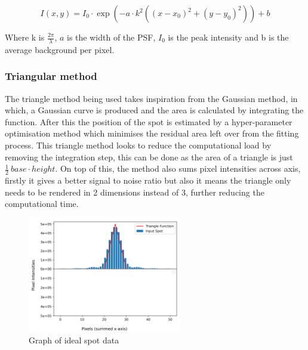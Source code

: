 \documentclass[aps,pra,a4paper,nofootinbib,onecolumn,tightenlines,longbibliography,12pt,amsfonts,amssymb,amsmath,floatfix]{revtex4-2} %
\begin{document}
    $$I(x,y)=I_0\cdot \exp(-a\cdot k^2((x-x_0)^2+(y-y_0)^2))+b$$

    Where k is $\frac{2\pi}{\lambda}$, $a$ is the width of the PSF, $I_0$ is the peak intensity and b is the average background per pixel. \cite{small2014fluorophore}

    
    \subsubsection{Triangular method} %
    \label{ssub:Triangular method}
    
    The triangle method being used takes inspiration from the Gaussian method, in which,
    a Gaussian curve is produced and the area is calculated by integrating the function. 
    After this the position of the spot is estimated by a hyper-parameter optimisation method 
    which minimises the residual area left over from the fitting process.
    This triangle method looks to reduce the computational load by removing the integration step, 
    this can be done as the area of a triangle is just $\frac{1}{2}\ base\cdot height$. 
    On top of this, the method also sums pixel intensities across axis, firstly it gives a 
    better signal to noise ratio but also it means the triangle only needs to be rendered in 2 dimensions 
    instead of 3, further reducing the computational time. 

    \begin{figure}[H]
      \begin{center}
        \includegraphics[width=0.6\textwidth]{project_pics/visual_test_2.png}
      \end{center}
      \caption{Graph of ideal spot data}
      \label{fig:visual_test_2}
    \end{figure}
\end{document}
